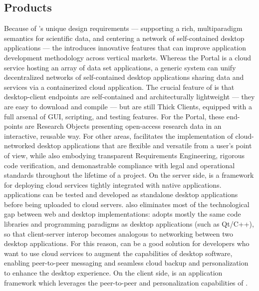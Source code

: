 \documentclass[11pt,letterpaper]{article}
\begin{document}
\subsection{{\lMOSAIC} Products}
Because of {\MOSAIC}'s unique design 
requirements --- supporting a 
rich, multiparadigm semantics for scientific data,  
and centering a network of self-contained 
desktop applications --- the {\MOSAIC} {\SDK} 
introduces innovative features that can improve 
application development methodology across vertical markets.  
Whereas the {\MOSAIC} Portal is a cloud service 
hosting an array of data set applications, a 
generic {\MOSAIC} system can unify decentralized 
networks of self-contained desktop applications sharing 
data and services via a containerized cloud application.  
\p{}
The crucial feature of {\MOSAIC} is that desktop-client 
endpoints are self-contained and architecturally 
lightweight --- they are easy to download and 
compile --- but are still Thick Clients, equipped with 
a full arsenal of GUI, scripting, and testing features.  
For the {\MOSAIC} Portal, these end-points are Research Objects 
presenting open-access research data in an interactive, reusable 
way.  For other areas, {\MOSAIC} facilitates the 
implementation of cloud-networked desktop 
applications 
that are flexible and versatile 
from a user's point of view, 
while also embodying transparent Requirements 
Engineering, rigorous code verification, 
and demonastrable compliance with 
legal and operational standards throughout the 
lifetime of a project.
\p{}
\lead{{\NDPCloud}} On the 
server side, {\NDPCloud} is a framework for deploying 
cloud services tightly integrated with native applications.  
{\NDPCloud} applications can be tested and 
developed as standalone desktop applications before 
being uploaded to cloud servers.  
{\NDPCloud} also eliminates most of the technological 
gap between web and desktop implementations:   
{\NDPCloud} adopts mostly the same code libraries 
and programming paradigms as 
desktop applications (such as Qt/C++), 
so that client-server interop 
becomes analogous to networking between two 
desktop applications.  For this reason, {\NDPCloud} 
can be a good solution for developers who want to 
use cloud services to augment the capabilities 
of desktop software, enabling peer-to-peer 
messaging and seamless cloud backup and 
personalization to enhance the desktop experience.
\p{}
\lead{{\VersatileUX}} On the client side, {\VersatileUX} is an {\GUI} 
application framework which leverages 
the peer-to-peer and personalization 
capabilities of {\NDPCloud}.  {\VersatileUX} 
\end{document}
